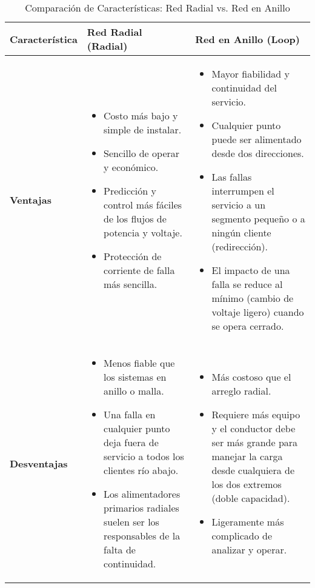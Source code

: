 \begin{table*}[t]
  \centering
  \caption{Comparación de Características: Red Radial vs. Red en Anillo}
  \label{tab:comparacion_redes_mejorada}
  \begin{tabular}{p{} p{} p{}}
    \toprule
    \textbf{Característica} & \textbf{Red Radial (Radial)} & \textbf{Red en Anillo (Loop)} \\
    \midrule
    \textbf{Ventajas} &
    \begin{itemize}
      \item Costo más bajo y simple de instalar.
      \item Sencillo de operar y económico.
      \item Predicción y control más fáciles de los flujos de potencia y voltaje.
      \item Protección de corriente de falla más sencilla.
    \end{itemize} &
    \begin{itemize}
      \item Mayor fiabilidad y continuidad del servicio.
      \item Cualquier punto puede ser alimentado desde dos direcciones.
      \item Las fallas interrumpen el servicio a un segmento pequeño o a ningún cliente (redirección).
      \item El impacto de una falla se reduce al mínimo (cambio de voltaje ligero) cuando se opera cerrado.
    \end{itemize} \\
    \cmidrule(lr){1-3}
    \textbf{Desventajas} &
    \begin{itemize}
      \item Menos fiable que los sistemas en anillo o malla.
      \item Una falla en cualquier punto deja fuera de servicio a todos los clientes río abajo.
      \item Los alimentadores primarios radiales suelen ser los responsables de la falta de continuidad.
    \end{itemize} &
    \begin{itemize}
      \item Más costoso que el arreglo radial.
      \item Requiere más equipo y el conductor debe ser más grande para manejar la carga desde cualquiera de los dos extremos (doble capacidad).
      \item Ligeramente más complicado de analizar y operar.

\end{itemize}
\end{tabular}
\end{table*}
